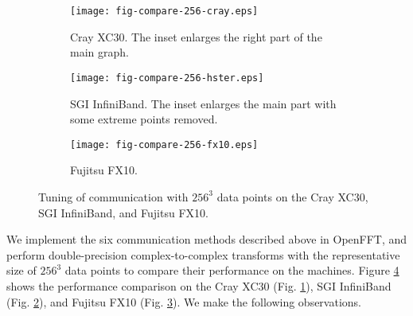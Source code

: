 \begin{figure}[htbp]
        \begin{subfigure}{\textwidth}
                \centering
                \texttt{[image: fig-compare-256-cray.eps]}
                \caption{Cray XC30. The inset enlarges the right part of the main graph.}
                \label{fig-tuning-cray}
        \end{subfigure}

        \begin{subfigure}{\textwidth}
                \centering
                \texttt{[image: fig-compare-256-hster.eps]}
                \caption{SGI InfiniBand. The inset enlarges the main part with some extreme points removed.}
                \label{fig-tuning-hster}
        \end{subfigure}

        \begin{subfigure}{\textwidth}
                \centering
                \texttt{[image: fig-compare-256-fx10.eps]}
                \caption{Fujitsu FX10.}
                \label{fig-tuning-fx10}
        \end{subfigure}\caption{Tuning of communication with $256^3$ data points on the Cray XC30, SGI InfiniBand, and Fujitsu FX10.}\label{fig-tuning-comm}
\end{figure}

We implement the six communication methods described above in OpenFFT, and perform double-precision complex-to-complex transforms with the representative size of $256^3$ data points to compare their performance on the machines. 
Figure \ref{fig-tuning-comm} shows the performance comparison on the Cray XC30 (Fig. \ref{fig-tuning-cray}), SGI InfiniBand (Fig. \ref{fig-tuning-hster}), and Fujitsu FX10 (Fig. \ref{fig-tuning-fx10}). We make the following observations. 

